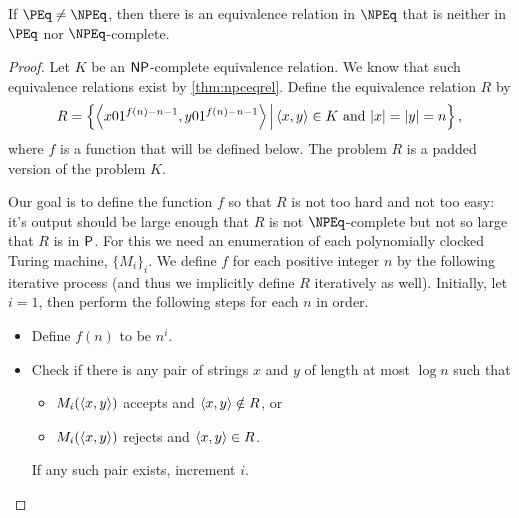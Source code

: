 \begin{theorem}\label{thm:intermediary}
  If $\PEq \neq \NPEq$, then there is an equivalence relation in $\NPEq$ that is neither in $\PEq$ nor $\NPEq$-complete.
\end{theorem}
\begin{proof}
  Let $K$ be an $\NP$-complete equivalence relation.
  We know that such equivalence relations exist by \autoref{thm:npceqrel}.
  Define the equivalence relation $R$ by
  \begin{equation*}
    R = \left\{\left\langle x 0 1^{f(n) - n - 1}, y 0 1^{f(n) - n - 1}\right\rangle \, \middle| \, \pair{x}{y} \in K \text{ and } |x| = |y| = n\right\},
  \end{equation*}
  where $f$ is a function that will be defined below.
  The problem $R$ is a padded version of the problem $K$.

  Our goal is to define the function $f$ so that $R$ is not too hard and not too easy: it's output should be large enough that $R$ is not $\NPEq$-complete but not so large that $R$ is in $\P$.
  For this we need an enumeration of each polynomially clocked Turing machine, $\{M_i\}_i$.
  We define $f$ for each positive integer $n$ by the following iterative process (and thus we implicitly define $R$ iteratively as well).
  Initially, let $i = 1$, then perform the following steps for each $n$ in order.
  \begin{itemize}
  \item Define $f(n)$ to be $n^i$.
  \item
    Check if there is any pair of strings $x$ and $y$ of length at most $\log n$ such that
    \begin{itemize}
    \item $M_i(\pair{x}{y})$ accepts and $\pair{x}{y} \notin R$, or
    \item $M_i(\pair{x}{y})$ rejects and $\pair{x}{y} \in R$.
    \end{itemize}
    If any such pair exists, increment $i$.
  \end{itemize}


\end{proof}
